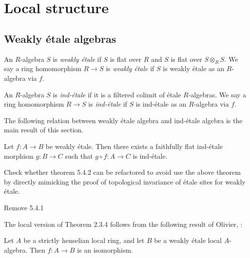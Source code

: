 \chapter{Local structure}

\section{Weakly étale algebras}

\begin{definition}
    An $R$-algebra $S$ is \emph{weakly étale} if $S$ is flat over $R$ and
    $S$ is flat over $S \otimes_{R} S$. We say a ring homomorphism
    $R \to S$ is \emph{weakly étale} if $S$ is weakly étale as an $R$-algebra via $f$.
    \label{def:weakly-etale-algebra}
\end{definition}

\begin{definition}
    An $R$-algebra $S$ is \emph{ind-étale} if it is a filtered colimit of étale $R$-algebras.
    We say a ring homomorphism $R \to S$ is \emph{ind-étale} if $S$ is ind-étale as an $R$-algebra via $f$.
    \label{def:ind-etale-algebra}
\end{definition}

The following relation between weakly étale algebra and ind-étale algebra is the main result of this section.
\begin{theorem}
Let $f: A \to B$ be weakly étale. Then there exists a faithfully flat ind-étale morphism $g: B \to C$ such that $g \circ f: A \to C$ is ind-étale.
    \label{thm:weakly-etale-ind-etale}
\end{theorem}

Check whether theorem 5.4.2 can be refactored to avoid use the above theorem by directly mimicking the proof of topological invariance of étale sites for weakly étale.

Remove 5.4.1



The local version of Theorem 2.3.4 follows from the following result of Olivier, \cite{Oli72}:

\begin{theorem}
Let $A$ be a strictly henselian local ring, and let $B$ be a weakly étale local $A$-algebra. Then $f: A \to B$ is an isomorphism.
    \label{thm:weakly-etale-local}
\end{theorem}


